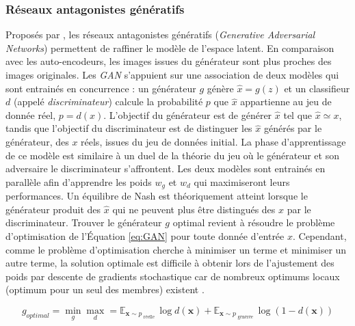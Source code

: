 


\subsubsection{Réseaux antagonistes génératifs} \label{subsubsec:GAN}
Proposés par \citeauthor{goodfellow_generative_2014} \cite{goodfellow_generative_2014}, les réseaux antagonistes génératifs (\textit{Generative Adversarial Networks}) permettent de raffiner le modèle de l'espace latent.
En comparaison avec les auto-encodeurs, les images issues du générateur sont plus proches des images originales.
Les \textit{GAN} s'appuient sur une association de deux modèles qui sont entrainés en concurrence : un générateur $g$ génère $\hat x = g(z)$ et un classifieur $d$ (appelé \textit{discriminateur}) calcule la probabilité $p$ que $\hat x$ appartienne au jeu de donnée réel, $p = d(x)$.
L'objectif du générateur est de générer $\hat x$ tel que $\hat x \simeq x$, tandis que l'objectif du discriminateur est de distinguer les $\hat x$ générés par le générateur, des $x$ réels, issues du jeu de données initial.
La phase d'apprentissage de ce modèle est similaire à un duel de la théorie du jeu où le générateur et son adversaire le discriminateur s'affrontent.
Les deux modèles sont entrainés en parallèle afin d'apprendre les poids $w_g$ et $w_d$ qui maximiseront leurs performances.
Un équilibre de Nash \cite{nash_equilibrium_1950, nash_noncooperative_1951} est théoriquement atteint lorsque le générateur produit des $\hat x$ qui ne peuvent plus être distingués des $x$ par le discriminateur.
Trouver le générateur $g$ optimal revient à résoudre le problème d'optimisation de l'Équation \ref{eq:GAN} pour toute donnée d'entrée $x$.
Cependant, comme le problème d'optimisation cherche à minimiser un terme et minimiser un autre terme, la solution optimale est difficile à obtenir lors de l'ajustement des poids par descente de gradients stochastique car de nombreux optimums locaux (optimum pour un seul des membres) existent \cite{goodfellow_generative_2014}.

\begin{equation} \label{eq:GAN}
g_{optimal}  = \min _{g} \max _{d} = \mathbb{E}_{\mathbf{x} \sim p_{\text { réelle }}} \log d(\boldsymbol{x})+\mathbb{E}_{\boldsymbol{x} \sim p_{\text { générée }}} \log (1-d(\boldsymbol{x}))
\end{equation}


